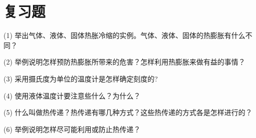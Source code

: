 \section*{复习题}

(1) 举出气体、液体、固体热胀冷缩的实例。气体、液体、固体的热膨胀有什么不同？

(2) 举例说明怎样预防热膨胀所带来的危害？怎样利用热膨胀来做有益的事情？

(3) 采用摄氏度为单位的温度计是怎样确定刻度的?

(4) 使用液体温度计要注意些什么？为什么？

(5) 什么叫做热传递？热传递有哪几种方式？这些热传递的方式各是怎样进行的？

(6) 举例说明怎样尽可能利用或防止热传递？

